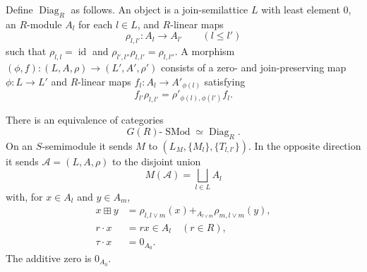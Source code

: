 Define $\operatorname{Diag}_R$ as follows.  An object is a join-semilattice $L$ with least
element $0$, an $R$-module $A_l$ for each $l\in L$, and $R$-linear maps
\[
 \rho_{l,l'}:A_l\to A_{l'}\qquad(l\le l')
\]
such that $\rho_{l,l}=\operatorname{id}$ and
$\rho_{l',l''}\rho_{l,l'}=\rho_{l,l''}$.  A morphism
$(\phi,f):(L,A,\rho)\to(L',A',\rho')$ consists of a zero- and join-preserving map
$\phi:L\to L'$ and $R$-linear maps $f_l:A_l\to A'_{\phi(l)}$ satisfying
\[
 f_{l'}\rho_{l,l'}=\rho'_{\phi(l),\phi(l')}f_l.
\]

\begin{theorem}
\label{thm:gcue-semimodule-equivalence}
There is an equivalence of categories
\[
 G(R)\text{-}\operatorname{SMod}\simeq\operatorname{Diag}_R.
\]
On an $S$-semimodule it sends $M$ to
$(L_M,\{M_l\},\{T_{l,l'}\})$.  In the opposite direction it sends
$\mathcal A=(L,A,\rho)$ to the disjoint union
\[
 M(\mathcal A)=\bigsqcup_{l\in L}A_l
\]
with, for $x\in A_l$ and $y\in A_m$,
\begin{align*}
 x\boxplus y
 &=\rho_{l,l\vee m}(x)+_{A_{l\vee m}}\rho_{m,l\vee m}(y),\\
 r\cdot x&=rx\in A_l\quad(r\in R),\\
 \tau\cdot x&=0_{A_0}.
\end{align*}
The additive zero is $0_{A_0}$.
\end{theorem}

